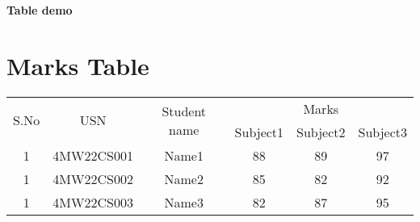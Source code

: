 \documentclass[10pt,a4paper]{article}
\begin{document}
\begin{center}
\textbf{\large Table demo}\\
\vspace{2cm}
\end{center}

\section*{Marks Table}
\begin{tabular}{|c|c|c|c|c|c|} \hline
\multirow{2}{*}{S.No} & \multirow{2}{*}{USN} & \multirow{2}{*}{Student name} & \multicolumn{3}{c|}{Marks}\\

\cline{4-6} &&& Subject1 & Subject2 & Subject3 \\ \hline
1 & 4MW22CS001 & Name1 & 88 & 89 & 97\\ \hline
1 & 4MW22CS002 & Name2 & 85 & 82 & 92\\ \hline
1 & 4MW22CS003 & Name3 & 82 & 87 & 95\\ \hline
\end{tabular}
\end{document}
